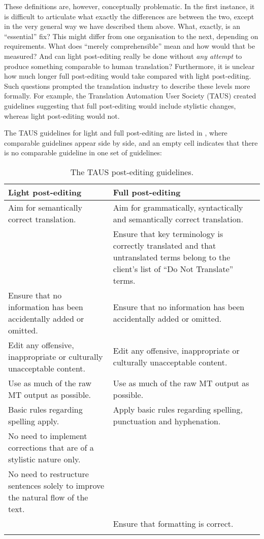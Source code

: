\documentclass[output=paper,colorlinks,citecolor=brown]{langscibook}
\begin{document}
\begin{sloppypar}
These definitions are, however, conceptually problematic. In the first instance, it is difficult to articulate what exactly the differences are between the two, except in the very general way we have described them above. What, exactly, is an “essential” fix? This might differ from one organisation to the next, depending on requirements. What does “merely comprehensible” mean and how would that be measured? And can light post-editing really be done without \textit{any attempt} to produce something comparable to human translation? Furthermore, it is unclear how much longer full post-editing would take compared with light post-editing. Such questions prompted the translation industry to describe these levels more formally. For example, the Translation Automation User Society (TAUS) created guidelines suggesting that full post-editing would include stylistic changes, where\-as light post-editing would not.
\end{sloppypar}

The TAUS guidelines \citep{TAUS2010} for light and full post-editing are listed in , where comparable guidelines appear side by side, and an empty cell indicates that there is no comparable guideline in one set of guidelines:


\begin{table}[t]
\begin{tabularx}{\textwidth}{QQ}
\lsptoprule
Light post-editing & Full post-editing\\
\midrule
Aim for semantically correct translation. & Aim for grammatically, syntactically and semantically correct translation.\\
\tablevspace
& Ensure that key terminology is correctly translated and that untranslated terms belong to the client’s list of “Do Not Translate” terms.\\
\tablevspace
Ensure that no information has been accidentally added or omitted. & Ensure that no information has been accidentally added or omitted. \\
\tablevspace
Edit any offensive, inappropriate or culturally unacceptable content. & Edit any offensive, inappropriate or culturally unacceptable content.\\
\tablevspace
Use as much of the raw MT output as possible. & Use as much of the raw MT output as possible.\\
\tablevspace
Basic rules regarding spelling apply. & Apply basic rules regarding spelling, punctuation and hyphenation.\\
\tablevspace
No need to implement corrections that are of a stylistic nature only. & \\
\tablevspace
No need to restructure sentences solely to improve the natural flow of the text. & \\
& Ensure that formatting is correct.\\
\lspbottomrule
\end{tabularx}
\caption{The TAUS post-editing guidelines.\label{tab:obrien:1}}
\end{table}
\end{document}
